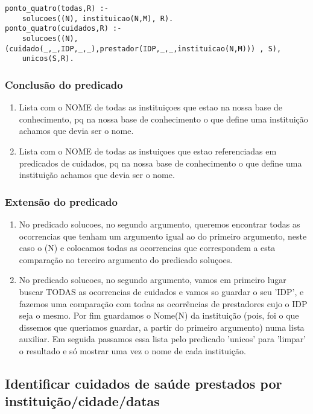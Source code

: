 \documentclass[a4paper]{report} %
\begin{document}
\begin{verbatim}
ponto_quatro(todas,R) :- 
    solucoes((N), instituicao(N,M), R).
ponto_quatro(cuidados,R) :- 
    solucoes((N), (cuidado(_,_,IDP,_,_),prestador(IDP,_,_,instituicao(N,M))) , S),
    unicos(S,R).
\end{verbatim}

\subsubsection{Conclusão do predicado} 
\begin{enumerate}
\item Lista com o NOME de todas as instituiçoes que estao na nossa base de conhecimento, pq na nossa base de conhecimento o que define uma instituição achamos que devia ser o nome.
\item Lista com o NOME de todas as instuiçoes que estao referenciadas em predicados de cuidados, pq na nossa base de conhecimento o que define uma instituição achamos que devia ser o nome.
\end{enumerate}

\subsubsection{Extensão do predicado}
\begin{enumerate}
\item No predicado solucoes, no segundo argumento, queremos encontrar todas as ocorrencias que tenham um argumento igual ao do primeiro argumento, neste caso o (N) e colocamos todas as ocorrencias que correspondem a esta comparação no terceiro argumento do predicado soluçoes.
\item No predicado solucoes, no segundo argumento, vamos em primeiro lugar buscar TODAS as ocorrencias de cuidados e vamos so guardar o seu 'IDP', e fazemos uma comparação com todas as ocorrências de prestadores cujo o IDP seja o mesmo. Por fim guardamos o Nome(N) da instituição (pois, foi o que dissemos que queriamos guardar, a partir do primeiro argumento) numa lista auxiliar. Em seguida passamos essa lista pelo predicado 'unicos' para 'limpar' o resultado e só mostrar uma vez o nome de cada instituição.
\end{enumerate}

\subsection{Identificar cuidados de saúde prestados por instituição/cidade/datas}
\end{document}
